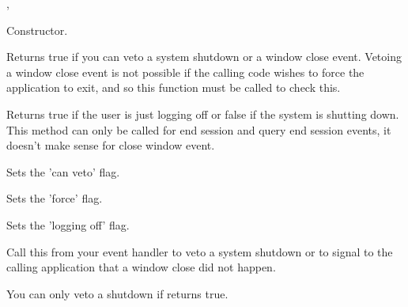 
,\rtfsp
{}



\label{wxcloseeventctor}


Constructor.


\label{wxcloseeventcanveto}


Returns true if you can veto a system shutdown or a window close event.
Vetoing a window close event is not possible if the calling code wishes to
force the application to exit, and so this function must be called to check this.


\label{wxcloseeventgetloggingoff}


Returns true if the user is just logging off or false if the system is
shutting down. This method can only be called for end session and query end
session events, it doesn't make sense for close window event.


\label{wxcloseeventsetcanveto}


Sets the 'can veto' flag.


\label{wxcloseeventsetforce}


Sets the 'force' flag.


\label{wxcloseeventsetloggingoff}


Sets the 'logging off' flag.


\label{wxcloseeventveto}


Call this from your event handler to veto a system shutdown or to signal
to the calling application that a window close did not happen.

You can only veto a shutdown if  returns
true.


